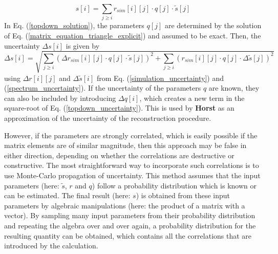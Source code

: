 \documentclass{article}
\begin{document}
\begin{equation}
	\label{topdown_solution}
	s[i] = \sum_{j \geq i} r_{sim}[i][j] \cdot q[j] \cdot \tilde{s}[j]
\end{equation}
%
In Eq. (\ref{topdown_solution}), the parameters $q[j]$ are determined by the solution of Eq. (\ref{matrix_equation_triangle_explicit}) and assumed to be exact.
Then, the uncertainty $\Delta s[i]$ is given by
%
\begin{equation}
	\label{topdown_uncertainty}
	\Delta s[i] = \sqrt{\sum_{j \geq i} \left( \Delta r_{sim}[i][j] \cdot q[j] \cdot \tilde{s}[j] \right)^2 + \sum_{j \geq i} \left( r_{sim}[i][j] \cdot q[j] \cdot \Delta \tilde{s}[j] \right)^2}
\end{equation}
%
using $\Delta r[i][j]$ and $\Delta \tilde{s} [i]$ from Eq. (\ref{simulation_uncertainty}) and (\ref{spectrum_uncertainty}).
If the uncertainty of the parameters $q$ are known, they can also be included by introducing $\Delta q[i]$, which creates a new term in the square-root of Eq. (\ref{topdown_uncertainty}).
This is used by \textbf{Horst} as an approximation of the uncertainty of the reconstruction procedure.

However, if the parameters are strongly correlated, which is easily possible if the matrix elements are of similar magnitude, then this approach may be false in either direction, depending on whether the correlations are destructive or constructive.
The most straightforward way to incorporate such correlations is to use Monte-Carlo propagation of uncertainty.
This method assumes that the input parameters (here: $\tilde{s}$, $r$ and $q$) follow a probability distribution which is known or can be estimated.
The final result (here: $s$) is obtained from these input parameters by algebraic manipulations (here: the product of a matrix with a vector).
By sampling many input parameters from their probability distribution and repeating the algebra over and over again, a probability distribution for the resulting quantity can be obtained, which contains all the correlations that are introduced by the calculation.
\end{document}
